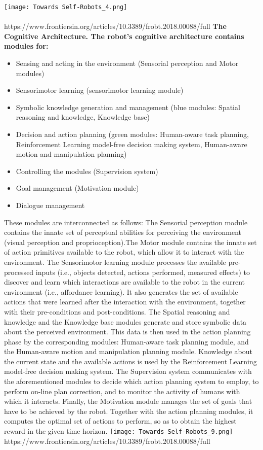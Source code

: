 \documentclass{amsbook}
\begin{document}
{\texttt{[image: Towards Self-Robots\_4.png]}
\\\\\vskip 0.2cm
https://www.frontiersin.org/articles/10.3389/frobt.2018.00088/full\clearpage
\textbf{\huge{The Cognitive Architecture.}\vskip 0.2cm
The robot's cognitive architecture contains modules for:}
\begin{itemize}
    \item Sensing and acting in the environment (Sensorial perception and Motor modules)
    \item Sensorimotor learning (sensorimotor learning module) 
    \item Symbolic knowledge generation and management (blue modules: Spatial reasoning and knowledge, Knowledge base) 
    \item Decision and action planning (green modules: Human-aware task planning, Reinforcement Learning model-free decision making system, Human-aware motion and manipulation planning)
    \item Controlling the modules (Supervision system)
    \item Goal management (Motivation module)
    \item Dialogue management
\end{itemize}
\vskip 0.3cm
These modules are interconnected as follows:
\vskip 0.2cm
The Sensorial perception module contains the innate set of perceptual abilities for perceiving the environment (visual perception and proprioception).The Motor module contains the innate set of action primitives available to the robot, which allow it to interact with the environment.
\vskip 0.2cm
The Sensorimotor learning module processes the available pre-processed inputs (i.e., objects detected, actions performed, measured eﬀects) to discover and learn which interactions are available to the robot in the current environment (i.e., aﬀordance learning). It also generates the set of available actions that were learned after the interaction with the environment, together with their pre-conditions and post-conditions.
\vskip 0.2cm
The Spatial reasoning and knowledge and the Knowledge base modules generate and store symbolic data about the perceived environment. This data is then used in the action planning phase by the corresponding modules: Human-aware task planning module, and the Human-aware motion and manipulation planning module. Knowledge about the current state and the available actions is used by the Reinforcement Learning model-free decision making system.\vskip 0.2cm
The Supervision system communicates with the aforementioned modules to decide which action planning system to employ, to perform on-line plan correction, and to monitor the activity of humans with which it interacts.
\vskip 0.2cm\clearpage
Finally, the Motivation module manages the set of goals that have to be achieved by the robot. Together with the action planning modules, it computes the optimal set of actions to perform, so as to obtain the highest reward in the given time horizon. 
\vskip 2cm
\texttt{[image: Towards Self-Robots\_9.png]}
https://www.frontiersin.org/articles/10.3389/frobt.2018.00088/full
}
\end{document}
